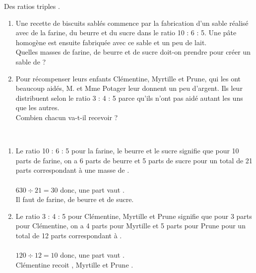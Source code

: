 \begin{colonne*exercice}
\bigskip


\begin{exercice} %
   Des ratios \og triples \fg.
      \begin{enumerate}
         \item Une recette de biscuits sablés commence par la fabrication d'un \og sable \fg{} réalisé avec de la farine, du beurre et du sucre dans le ratio 10 : 6 : 5. Une pâte homogène est ensuite fabriquée avec ce sable et un peu de lait. \\
         Quelles masses de farine, de beurre et de sucre doit-on prendre pour créer un \og sable \fg{} de  ?
      \item Pour récompenser leurs enfants Clémentine, Myrtille et Prune, qui les ont beaucoup aidés, M. et Mme Potager leur donnent un peu d'argent. Ils leur distribuent  selon le ratio 3 : 4 : 5 parce qu'ils n'ont pas aidé autant les uns que les autres. \\
         Combien chacun va-t-il recevoir ?
   \end{enumerate}
\end{exercice}

\begin{corrige}
\ \\ [-5mm]
   \begin{enumerate}
      \item Le ratio 10 : 6 : 5 pour la farine, le beurre et le sucre signifie que pour 10 parts de farine, on a 6 parts de beurre et 5 parts de sucre pour un total de 21 parts correspondant à une masse de . \\ [2mm]
           \quad  {} \\
         $630\div21 =30$ donc, une part vaut . \\
         Il faut {\blue {} de farine,  de beurre et  de sucre.}
      \item Le ratio 3 : 4 : 5 pour Clémentine, Myrtille et Prune signifie que pour 3 parts pour Clémentine, on a 4 parts pour Myrtille et 5 parts pour Prune pour un total de 12 parts correspondant à . \\ [2mm]
           \quad  {} \\
         $120\div12 =10$ donc, une part vaut . \\
         {\blue Clémentine recoit , Myrtille  et Prune .}
   \end{enumerate}
\end{corrige}


\end{colonne*exercice}
